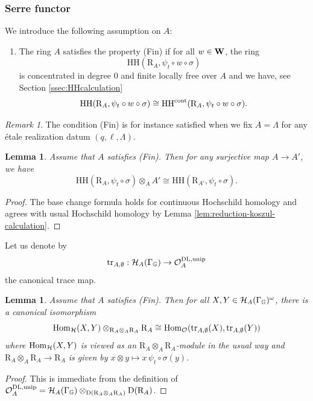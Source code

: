 \documentclass[a4paper, 10pt, oneside, reqno]{amsart}
\theoremstyle{plain}
\newtheorem{lem}[thm]{Lemma}
\theoremstyle{definition}
\theoremstyle{remark}
\newtheorem{rque}[thm]{Remark}
\newcommand{\Gbb}{\mathbb{G}}
\newcommand{\RR}{\mathrm{R}}
\newcommand{\HHH}{\mathrm{HH}}
\begin{document}
\subsubsection{Serre functor}\label{sec:serre-functor}

We introduce the following assumption on $A$: 

\begin{enumerate}
\item[(Fin)] The ring $A$ satisfies the property (Fin) if for all $w \in \mathbf{W}$, the ring 
$$\HHH(\RR_A, \psi_t \circ w \circ \sigma)$$ 
is concentrated in degree $0$ and finite locally free over $A$ and we have, see Section \ref{ssec:HHcalculation}	
$$\HHH(\RR_A, \psi_t \circ w \circ \sigma) \cong \HHH^{\cont}(\RR_A, \psi_t \circ w \circ \sigma).$$ 
\end{enumerate}

\begin{rque}
The condition (Fin) is for instance satisfied when we fix $A = \Lambda$ for any étale realization datum $(q,\ell, \Lambda)$.
\end{rque} 

\begin{lem}\label{lem:base-change-tori}
Assume that $A$ satisfies (Fin). Then for any surjective map $A \to A'$, we have 
$$\HHH(\RR_A, \psi_t \circ \sigma) \otimes_A A' \cong \HHH(\RR_{A'}, \psi_t \circ \sigma).$$
\end{lem}

\begin{proof}
The base change formula holds for continuous Hochschild homology and agrees with usual Hochschild homology by Lemma \ref{lem:reduction-koszul-calculation}.
\end{proof}

Let us denote by 
$$\tr_{A,\emptyset} : \Hcal_{A}(\Gamma_{\Gbb}) \to \Ocal_{A}^{\DL, \unip}$$
the canonical trace map. 

\begin{lem}\label{lem:calculation-tr-vs-category-o}
Assume that $A$ satisfies (Fin). Then for all $X,Y \in \Hcal_A(\Gamma_{\Gbb})^{\omega}$, there is a canonical isomorphism 
$$\Hom_{\Hcal}(X,Y) \otimes_{\RR_A \otimes_A \RR_A} \RR_A \cong \Hom_{\Ocal}(\tr_{A,\emptyset}(X), \tr_{A,\emptyset}(Y))$$
where $\mathrm{Hom}_{\mathcal{H}}(X,Y)$ is viewed as an $\RR_A \otimes_A \RR_A$-module in the usual way and $\RR_A \otimes_A \RR_A \to \RR_A$ is given by $x \otimes y\mapsto x\,\psi_t\circ \sigma(y)$.
\end{lem}

\begin{proof}
This is immediate from the definition of $\Ocal_{A}^{\DL, \unip} = \Hcal_A(\Gamma_{\Gbb}) \otimes_{\DD(\RR_A \otimes_A \RR_A)} \DD(\RR_A)$.
\end{proof}
\end{document}
